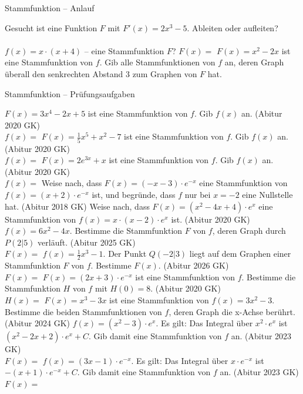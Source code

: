 \setcounter{aufgabe}{0}

\begin{aufgabe}{Stammfunktion – Anlauf}
\begin{teile}
\teil Gesucht ist eine Funktion $F$ mit $F'(x) = 2x^3 - 5$. Ableiten oder aufleiten? \\  \\ 
\teil $f(x) = x \cdot (x + 4)$ – eine Stammfunktion $F$? $F(x) = $ \leerfeld
\teil $F(x) = x^2 - 2x$ ist eine Stammfunktion von $f$. Gib alle Stammfunktionen von $f$ an, deren Graph überall den senkrechten Abstand $3$ zum Graphen von $F$ hat.
\end{teile}
\end{aufgabe}

\begin{aufgabe}{Stammfunktion – Prüfungsaufgaben}
\begin{teile}
\teil $F(x) = 3x^4 - 2x + 5$ ist eine Stammfunktion von $f$. Gib $f(x)$ an. \hfill (Abitur 2020 GK) \\ $f(x) = $ \leerfeld
\teil $F(x) = \frac{1}{5}x^5 + x^2 - 7$ ist eine Stammfunktion von $f$. Gib $f(x)$ an. \hfill (Abitur 2020 GK) \\ $f(x) = $ \leerfeld
\teil $F(x) = 2e^{3x} + x$ ist eine Stammfunktion von $f$. Gib $f(x)$ an. \hfill (Abitur 2020 GK) \\ $f(x) = $ \leerfeld
\teil Weise nach, dass $F(x) = (-x - 3) \cdot e^{-x}$ eine Stammfunktion von $f(x) = (x + 2) \cdot e^{-x}$ ist, und begründe, dass $f$ nur bei $x = -2$ eine Nullstelle hat. \hfill (Abitur 2018 GK)
\teil Weise nach, dass $F(x) = (x^2 - 4x + 4) \cdot e^{x}$ eine Stammfunktion von $f(x) = x \cdot (x - 2) \cdot e^{x}$ ist. \hfill (Abitur 2020 GK)
\teil $f(x) = 6x^2 - 4x$. Bestimme die Stammfunktion $F$ von $f$, deren Graph durch $P(2 | 5)$ verläuft. \hfill (Abitur 2025 GK) \\ $F(x) = $ \leerfeld
\teil $f(x) = \frac{1}{2}x^3 - 1$. Der Punkt $Q(-2 | 3)$ liegt auf dem Graphen einer Stammfunktion $F$ von $f$. Bestimme $F(x)$. \hfill (Abitur 2026 GK) \\ $F(x) = $ \leerfeld
\teil $F(x) = (2x + 3) \cdot e^{-x}$ ist eine Stammfunktion von $f$. Bestimme die Stammfunktion $H$ von $f$ mit $H(0) = 8$. \hfill (Abitur 2020 GK) \\ $H(x) = $ \leerfeld
\teil $F(x) = x^3 - 3x$ ist eine Stammfunktion von $f(x) = 3x^2 - 3$. Bestimme die beiden Stammfunktionen von $f$, deren Graph die x-Achse berührt. \hfill (Abitur 2024 GK)
\teil $f(x) = (x^2 - 3) \cdot e^{x}$. Es gilt: Das Integral über $x^2 \cdot e^{x}$ ist $(x^2 - 2x + 2) \cdot e^{x} + C$. Gib damit eine Stammfunktion von $f$ an. \hfill (Abitur 2023 GK) \\ $F(x) = $ \leerfeld
\teil $f(x) = (3x - 1) \cdot e^{-x}$. Es gilt: Das Integral über $x \cdot e^{-x}$ ist $-(x + 1) \cdot e^{-x} + C$. Gib damit eine Stammfunktion von $f$ an. \hfill (Abitur 2023 GK) \\ $F(x) = $ \leerfeld
\end{teile}
\end{aufgabe}

